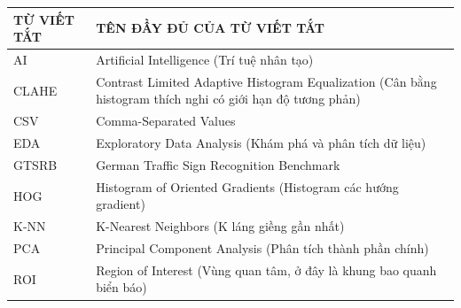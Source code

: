 
\begin{table}[H]
\centering
\begin{tabular}{|p{5cm}|p{9cm}|}
\hline
\centering\textbf{TỪ VIẾT TẮT} & \centering\arraybackslash\textbf{TÊN ĐẦY ĐỦ CỦA TỪ VIẾT TẮT} \\
\hline
AI & Artificial Intelligence (Trí tuệ nhân tạo) \\
\hline
CLAHE & Contrast Limited Adaptive Histogram Equalization (Cân bằng histogram thích nghi có giới hạn độ tương phản) \\
\hline
CSV & Comma-Separated Values \\
\hline
EDA & Exploratory Data Analysis (Khám phá và phân tích dữ liệu) \\
\hline
GTSRB & German Traffic Sign Recognition Benchmark \\
\hline
HOG & Histogram of Oriented Gradients (Histogram các hướng gradient) \\
\hline
K-NN & K-Nearest Neighbors (K láng giềng gần nhất) \\
\hline
PCA & Principal Component Analysis (Phân tích thành phần chính) \\
\hline
ROI & Region of Interest (Vùng quan tâm, ở đây là khung bao quanh biển báo) \\
\hline
\end{tabular}
\end{table}

